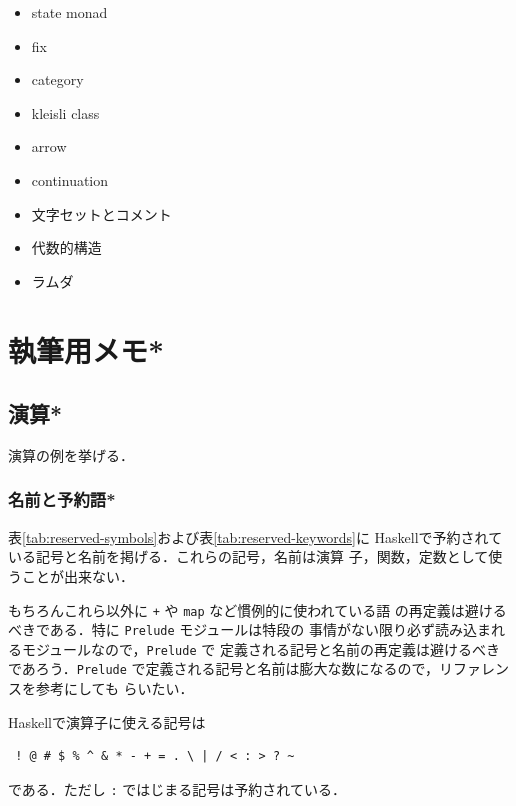 \documentclass[a5paper,twoside,fleqn,draft]{jsbook}
\newcommand{\TK}[1]{\mask{\textbf{TK:}~#1}{C}}
\newcommand{\programminglanguage}[1]{\textsf{#1}}
\newcommand{\haskell}{\programminglanguage{Haskell}}
\newenvironment{leader}{\begingroup\gt}{\endgroup}
\newcommand{\code}[1]{\texttt{#1}}
\newcommand{\filename}[1]{\texttt{#1}}
\begin{document}
\TK{TO DO}
\begin{itemize}
\item state monad
\item fix
\item category
\item kleisli class
\item arrow
\item continuation
\item 文字セットとコメント
\item 代数的構造
\item ラムダ
\end{itemize}

\part{執筆用メモ*}



\chapter{演算*}
\label{ch:arithmetic}

\begin{leader}
演算の例を挙げる．
\end{leader}


\section{名前と予約語*}

表\ref{tab:reserved-symbols}および表\ref{tab:reserved-keywords}に
\haskell で予約されている記号と名前を掲げる．これらの記号，名前は演算
子，関数，定数として使うことが出来ない．

もちろんこれら以外に \code{+} や \code{map} など慣例的に使われている語
の再定義は避けるべきである．特に \filename{Prelude} モジュールは特段の
事情がない限り必ず読み込まれるモジュールなので，\filename{Prelude} で
定義される記号と名前の再定義は避けるべきであろう．\filename{Prelude}
で定義される記号と名前は膨大な数になるので，リファレンスを参考にしても
らいたい．

\haskell で演算子に使える記号は
\begin{verbatim}
 ! @ # $ % ^ & * - + = . \ | / < : > ? ~
\end{verbatim}%
である．ただし \code{:} ではじまる記号は予約されている．

\end{document}
